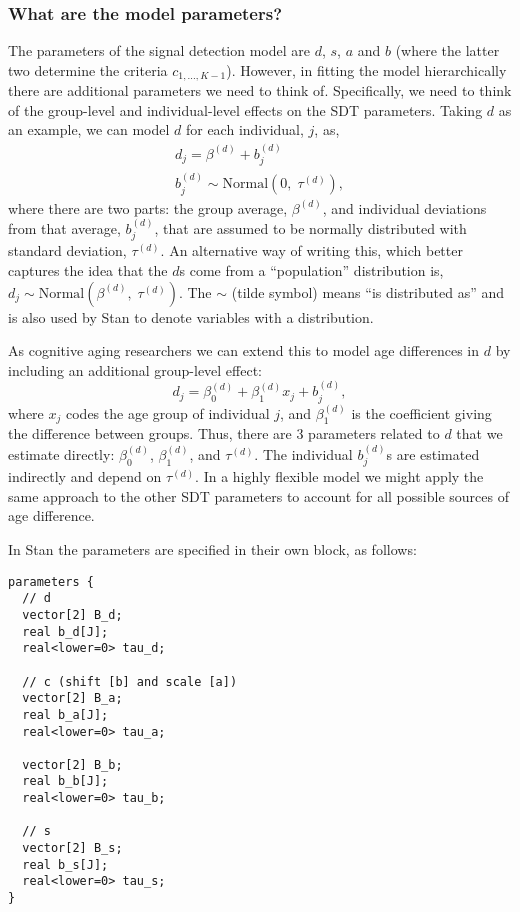 \documentclass[
  english,
  ,man,floatsintext]{apa6}
\begin{document}
\hypertarget{what-are-the-model-parameters}{%
\subsubsection{What are the model parameters?}\label{what-are-the-model-parameters}}

The parameters of the signal detection model are \(d\), \(s\), \(a\) and \(b\) (where the latter two determine the criteria \(c_{1, ..., K-1}\)). However, in fitting the model hierarchically there are additional parameters we need to think of. Specifically, we need to think of the group-level and individual-level effects on the SDT parameters. Taking \(d\) as an example, we can model \(d\) for each individual, \(j\), as,
\[
\begin{aligned}
d_{j} = \beta^{(d)} + b^{(d)}_{j} \\
b^{(d)}_{j} \sim \mbox{Normal}(0, \; \tau^{(d)}),
\end{aligned}
\]
where there are two parts: the group average, \(\beta^{(d)}\), and individual deviations from that average, \(b^{(d)}_{j}\), that are assumed to be normally distributed with standard deviation, \(\tau^{(d)}\). An alternative way of writing this, which better captures the idea that the \(d\)s come from a \enquote{population} distribution is, \(d_j \sim \mbox{Normal}(\beta^{(d)}, \; \tau^{(d)})\). The \(\sim\) (tilde symbol) means \enquote{is distributed as} and is also used by Stan to denote variables with a distribution.

As cognitive aging researchers we can extend this to model age differences in \(d\) by including an additional group-level effect:
\[
d_{j} = \beta_{0}^{(d)} + \beta_{1}^{(d)}x_j + b^{(d)}_{j},
\]
where \(x_j\) codes the age group of individual \(j\), and \(\beta_{1}^{(d)}\) is the coefficient giving the difference between groups. Thus, there are 3 parameters related to \(d\) that we estimate directly: \(\beta_{0}^{(d)}\), \(\beta_{1}^{(d)}\), and \(\tau^{(d)}\). The individual \(b^{(d)}_{j}\)s are estimated indirectly and depend on \(\tau^{(d)}\). In a highly flexible model we might apply the same approach to the other SDT parameters to account for all possible sources of age difference.

In Stan the parameters are specified in their own block, as follows:

\begin{verbatim}
parameters {
  // d
  vector[2] B_d;
  real b_d[J];
  real<lower=0> tau_d;
  
  // c (shift [b] and scale [a])
  vector[2] B_a;
  real b_a[J];
  real<lower=0> tau_a;
  
  vector[2] B_b;
  real b_b[J];
  real<lower=0> tau_b;
  
  // s
  vector[2] B_s;
  real b_s[J];
  real<lower=0> tau_s;
}
\end{verbatim}
\end{document}
